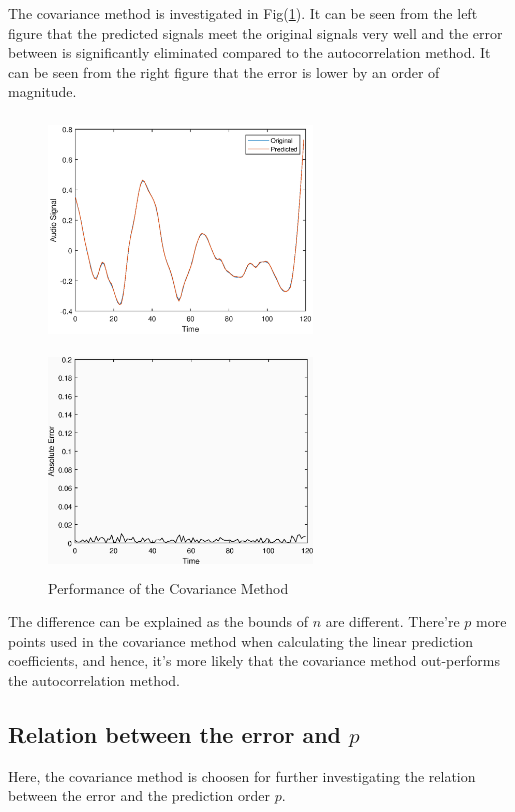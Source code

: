 \documentclass[preprint,12pt]{elsarticle}
\begin{document}
The covariance method is investigated in Fig(\ref{fig:performance_cov}). It can be seen from the left figure that the predicted signals meet the original signals very well and the error between is significantly eliminated compared to the autocorrelation method. It can be seen from the right figure that the error is lower by an order of magnitude.

\begin{figure}[!htbp]\centering	
	\begin{minipage}{6.5cm}
		\centering
		\includegraphics[height=6cm,width=7cm]{../pic/covariance_120_6.eps}
	\end{minipage}
	\begin{minipage}{6.5cm}
		\centering
		\includegraphics[height=6cm,width=7cm]{../pic/covariance_err_120_6.eps}
	\end{minipage}
	\caption{Performance of the Covariance Method}\label{fig:performance_cov}
\end{figure}

The difference can be explained as the bounds of $n$ are different. There're $p$ more points used in the covariance method when calculating the linear prediction coefficients, and hence, it's more likely that the covariance method out-performs the autocorrelation method.

\subsection{Relation between the error and $p$}
Here, the covariance method is choosen for further investigating the relation between the error and the prediction order $p$. 
\end{document}
